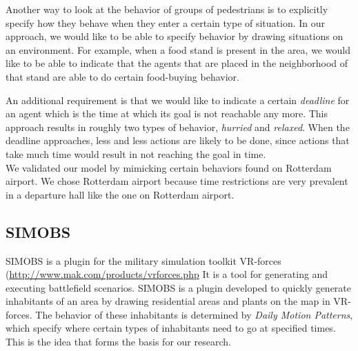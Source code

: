 \documentclass[11pt]{book}
\begin{document}
Another way to look at the behavior of groups of pedestrians is to explicitly specify how they behave when they enter a certain type of situation. In our approach, we would like to be able to specify behavior by drawing situations on an environment. For example, when a food stand is present in the area, we would like to be able to indicate that the agents that are placed in the neighborhood of that stand are able to do certain food-buying behavior.

An additional requirement is that we would like to indicate a certain \emph{deadline} for an agent which is the time at which its goal is not reachable any more. This approach results in roughly two types of behavior, \emph{hurried} and \emph{relaxed}. When the deadline approaches, less and less actions are likely to be done, since actions that take much time would result in not reaching the goal in time.\\
We validated our model by mimicking certain behaviors found on Rotterdam airport. We chose Rotterdam airport because time restrictions are very prevalent in a departure hall like the one on Rotterdam airport.



\subsection{SIMOBS}
SIMOBS is a plugin for the military simulation toolkit VR-forces (\url{http://www.mak.com/products/vrforces.php} It is a tool for generating and executing battlefield scenarios. SIMOBS is a plugin developed to quickly generate inhabitants of an area by drawing residential areas and plants on the map in VR-forces. The behavior of these inhabitants is determined by \emph{Daily Motion Patterns}, which specify where certain types of inhabitants need to go at specified times. This is the idea that forms the basis for our research.
\end{document}
